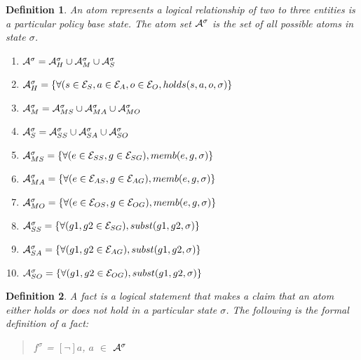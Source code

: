 \documentclass[10pt, twocolumn]{article}
\newtheorem{definition}{Definition}
\begin{document}
        \begin{definition}
          An atom represents a logical relationship of two to three entities
          is a particular policy base state. The atom set $\cal{A}^{\sigma}$ is
          the set of all possible atoms in state $\sigma$.

          \begin{enumerate}
            \item
              ${\cal A}^{\sigma} = {\cal A}^{\sigma}_{H} \cup {\cal A}^{\sigma}_{M} \cup {\cal A}^{\sigma}_{S}$
            \item
              ${\cal A}^{\sigma}_{H} = \{\forall (s \in {\cal E}_{S}, a \in {\cal E}_{A}, o \in {\cal E}_{O}, holds(s, a, o, \sigma) \}$
            \item
              ${\cal A}^{\sigma}_{M} = {\cal A}^{\sigma}_{MS} \cup {\cal A}^{\sigma}_{MA} \cup {\cal A}^{\sigma}_{MO}$
            \item
              ${\cal A}^{\sigma}_{S} = {\cal A}^{\sigma}_{SS} \cup {\cal A}^{\sigma}_{SA} \cup {\cal A}^{\sigma}_{SO}$
            \item
              ${\cal A}^{\sigma}_{MS} = \{\forall (e \in {\cal E}_{SS}, g \in {\cal E}_{SG}), memb(e, g, \sigma)\}$
            \item
              ${\cal A}^{\sigma}_{MA} = \{\forall (e \in {\cal E}_{AS}, g \in {\cal E}_{AG}), memb(e, g, \sigma)\}$
            \item
              ${\cal A}^{\sigma}_{MO} = \{\forall (e \in {\cal E}_{OS}, g \in {\cal E}_{OG}), memb(e, g, \sigma)\}$
            \item
              ${\cal A}^{\sigma}_{SS} = \{\forall (g1, g2 \in {\cal E}_{SG}), subst(g1, g2, \sigma)\}$
            \item
              ${\cal A}^{\sigma}_{SA} = \{\forall (g1, g2 \in {\cal E}_{AG}), subst(g1, g2, \sigma)\}$
            \item
              ${\cal A}^{\sigma}_{SO} = \{\forall (g1, g2 \in {\cal E}_{OG}), subst(g1, g2, \sigma)\}$
          \end{enumerate}

        \end{definition} 

        \begin{definition}
          A fact is a logical statement that makes a claim that an atom either
          holds or does not hold in a particular state $\sigma$. The following
          is the formal definition of a fact:

          \begin{quote}
            $f^{\sigma}$ = $[\lnot]$$a$, $a$ $\in$ ${\cal A}^{\sigma}$
          \end{quote}
        \end{definition}
\end{document}
